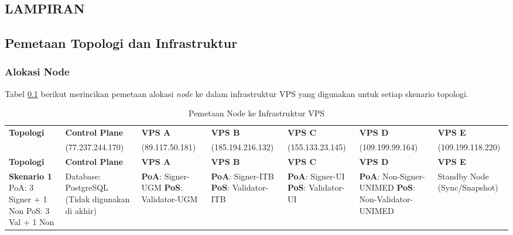 \clearpage
\begin{landscape}
\chapter*{LAMPIRAN}
\section{Pemetaan Topologi dan Infrastruktur}

\subsection{Alokasi Node}
Tabel \ref{tab:topology_mapping} berikut merincikan pemetaan alokasi \textit{node} ke dalam infrastruktur VPS yang digunakan untuk setiap skenario topologi.

{
\scriptsize
\begin{longtable}{|p{2.5cm}|p{3cm}|p{3cm}|p{3cm}|p{3cm}|p{3cm}|p{3cm}|}
\caption{Pemetaan Node ke Infrastruktur VPS} \label{tab:topology_mapping} \\
\hline
\textbf{Topologi} & \textbf{Control Plane} & \textbf{VPS A} & \textbf{VPS B} & \textbf{VPS C} & \textbf{VPS D} & \textbf{VPS E} \\
& (77.237.244.170) & (89.117.50.181) & (185.194.216.132) & (155.133.23.145) & (109.199.99.164) & (109.199.118.220) \\
\hline
\endfirsthead
\hline
\textbf{Topologi} & \textbf{Control Plane} & \textbf{VPS A} & \textbf{VPS B} & \textbf{VPS C} & \textbf{VPS D} & \textbf{VPS E} \\
\hline
\endhead
\hline
\endlastfoot

\textbf{Skenario 1} \newline
PoA: 3 Signer + 1 Non \newline
PoS: 3 Val + 1 Non
& 
Database: PostgreSQL \newline
(Tidak digunakan di akhir)
& 
\textbf{PoA}: Signer-UGM \newline
\textbf{PoS}: Validator-UGM
& 
\textbf{PoA}: Signer-ITB \newline
\textbf{PoS}: Validator-ITB
& 
\textbf{PoA}: Signer-UI \newline
\textbf{PoS}: Validator-UI
& 
\textbf{PoA}: Non-Signer-UNIMED \newline
\textbf{PoS}: Non-Validator-UNIMED
& 
Standby Node \newline
(Sync/Snapshot)
\\ \hline


\end{longtable}}
\end{landscape}
